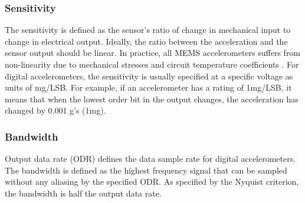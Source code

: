 \subsubsection{Sensitivity}
The sensitivity is defined as the sensor's ratio of change in mechanical input to change in electrical output. Ideally, the ratio between the acceleration and the sensor output should be linear. In practice, all MEMS accelerometers suffers from non-linearity due to mechanical stresses and circuit temperature coefficients  \cite{analog_accel_guide}. For digital accelerometers, the sensitivity is usually specified at a specific voltage as units of mg/LSB. For example, if an accelerometer has a rating of 1mg/LSB, it means that when the lowest order bit in the output changes, the acceleration has changed by 0.001 g's (1mg).

\subsubsection{Bandwidth}

Output data rate (ODR) defines the data sample rate for digital accelerometers. The bandwidth is defined as the highest frequency signal that can be sampled without any aliasing by the specified ODR. As specified by the Nyquist criterion, the bandwidth is half the output data rate. 